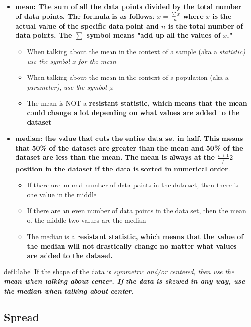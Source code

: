 \begin{itemize}
    \item \bf{mean:} The sum of all the data points divided by the total number of data points. The formula is as follows: $\bar{x} = \frac{\sum{x}}{n}$ where $x$ is the actual value of the specific data point and $n$ is the total number of data points. The $\sum$ symbol means "add up all the values of $x$." 
    \begin{itemize}
        \item When talking about the mean in the context of a sample (aka a \it{statistic}) use the symbol $\bar{x}$ for the mean
        \item When talking about the mean in the context of a population (aka a \it{parameter}), use the symbol $\mu$
        \item The mean is NOT a \bf{resistant statistic}, which means that the mean could change a lot depending on what values are added to the dataset
    \end{itemize}

    \item \bf{median:} the value that cuts the entire data set in half. This means that 50\% of the dataset are greater than the mean and 50\% of the dataset are less than the mean. The mean is always at the $\frac{n+1}/2$ position in the dataset if the data is sorted in numerical order.
    \begin{itemize}
        \item If there are an odd number of data points in the data set, then there is one value in the middle
        \item If there are an even number of data points in the data set, then the mean of the middle two values are the median
        \item The median is a \bf{resistant statistic}, which means that the value of the median will not drastically change no matter what values are added to the dataset.
    \end{itemize}
\end{itemize}

\begin{definition}{def1:label}
    If the shape of the data is \it{symmetric} and/or \it{centered}, then use the \bf{mean} when talking about center. If the data is \it{skewed} in any way, use the \bf{median} when talking about center.
\end{definition}


\subsection{Spread}

